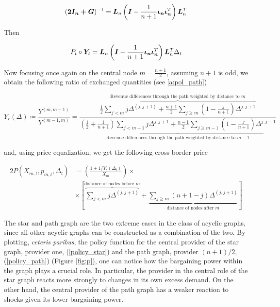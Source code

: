 \begin{equation}
  (\bm{2I_n + \bm{G}})^{-1} = \bm{L}_n  \left(\bm{I} - \frac{1}{n+1} \bm{\iota_n \iota_n}^T\right) \bm{L}_n^T
\end{equation}

Then

\begin{equation*}
  \begin{split}
    P_t \circ \bm{Y}_t &= \bm{L}_n  \left(\bm{I} - \frac{1}{n+1} \bm{\iota_n \iota_n}^T\right) \bm{L}_n^T  \Delta_t \\
  \end{split}
\end{equation*}

Now focusing once again on the central node $m = \frac{n+1}{2}$, assuming $n+1$ is odd, we obtain the following ratio of exchanged quantities (see \ref{a:pol_path})

\begin{equation}
  Y_r(\Delta) \coloneqq \frac{Y^{(m, m+1)}}{Y^{(m-1, m)}}
  = \frac{
    \overbrace{\frac{1}{2} \sum_{j < m} j \Delta^{(j, j+1)} + \frac{n+1}{2}\sum_{j \geq m} \left(1 - \frac{j}{n+1}\right) \Delta^{j, j+1}}^{\text{Revenue differences through the path weighted by distance to } m}
  }{
    \underbrace{\left(\frac{1}{2} + \frac{1}{n+1}\right) \sum_{j < m-1} j \Delta^{j, j+1}+ \frac{n-1}{2} \sum_{j \geq m-1} \left(1 - \frac{j}{n+1}\right) \Delta^{j, j+1}}_{\text{Revenue differences through the path weighted by distance to } m-1}
  }
\end{equation}

and, using price equalization, we get the following cross-border price

\begin{equation} \label{policy_path}
  \begin{split}
    2 P(X_{m, t}, p_{m, t}, \Delta_t) &= \left( \frac{1 + 1 / Y_r(\Delta_t)}{X_m} \right) \times  \\
    &\times \left[ \overbrace{\sum_{j < m} j \Delta^{(j, j + 1)}}^{\text{distance of nodes before } m} +  \underbrace{\sum_{j \geq m}\left(n + 1 - j\right) \Delta^{(j, j + 1)}}_{\text{distance of nodes after } m} \right]
  \end{split}
\end{equation}

The star and path graph are the two extreme cases in the class of acyclic graphs, since all other acyclic graphs can be constructed as a combination of the two. By plotting, \textit{ceteris paribus}, the policy function for the central provider of the star graph, provider one, (\ref{policy_star}) and the path graph, provider $(n+1) / 2$, (\ref{policy_path}) (Figure \ref{fig:p}), one can notice how the bargaining power within the graph plays a crucial role. In particular, the provider in the central role of the star graph reacts more strongly to changes in its own excess demand. On the other hand, the central provider of the path graph has a weaker reaction to shocks given its lower bargaining power.


